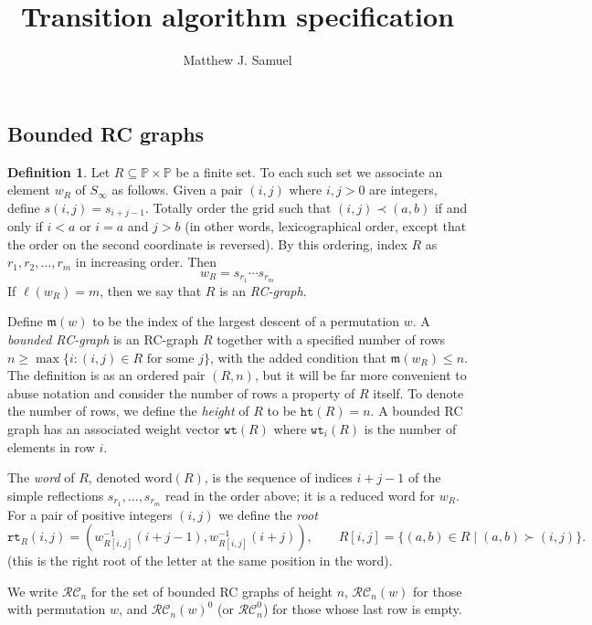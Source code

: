 \documentclass{amsart}
\title{Transition algorithm specification}
\author{Matthew J. Samuel}
\theoremstyle{definition}
\newtheorem{definition}[lemma]{Definition}
\theoremstyle{remark}
\numberwithin{equation}{subsection}
\newcommand{\wof}[1]{w_{#1}}
\newcommand{\wtt}{\mathtt{wt}}
\newcommand{\rtt}{\mathtt{rt}}
\newcommand{\hr}{\mathtt{ht}}
\newcommand{\RC}{\mathcal{RC}}
\newcommand{\maxd}{\mathfrak{m}}
\begin{document}
	\maketitle

\subsection{Bounded RC graphs}

\begin{definition}\label{definition:rcgraph}
	Let $R\subseteq \mathbb{P}\times \mathbb{P}$ be a finite set. To each such set we associate an element $\wof{R}$ of $S_\infty$ as follows. Given a pair $(i, j)$ where $i,j>0$ are integers, define $s(i,j) = s_{i+j - 1}$. Totally order the grid such that $(i, j) \prec (a, b)$ if and only if $i < a$ or $i = a$ and $j > b$ (in other words, lexicographical order, except that the order on the second coordinate is reversed). By this ordering, index $R$ as $r_1, r_2,\ldots, r_m$ in increasing order. Then
	$$\wof{R} = s_{r_1}\cdots s_{r_m}$$
	If $\ell(\wof{R}) = m$, then we say that $R$ is an \emph{RC-graph}.

	Define $\maxd(w)$ to be the index of the largest descent of a permutation $w$. A \emph{bounded RC-graph} is an RC-graph $R$ together with a specified number of rows $n\geq \max\{i: (i,j)\in R\text{ for some }j\}$, with the added condition that $\maxd(\wof{R})\leq n$. The definition is as an ordered pair $(R, n)$, but it will be far more convenient to abuse notation and consider the number of rows a property of $R$ itself. To denote the number of rows, we define the \emph{height} of $R$ to be $\hr(R)=n$. A bounded RC graph has an associated weight vector $\wtt(R)$ where $\wtt_i(R)$ is the number of elements in row $i$.

	The \emph{word} of $R$, denoted $\mathrm{word}(R)$, is the sequence of indices $i+j-1$ of the simple reflections $s_{r_1},\ldots,s_{r_m}$ read in the order above; it is a reduced word for $\wof{R}$. For a pair of positive integers $(i,j)$ we define the \emph{root}
	$$\rtt_R(i,j)=(\wof{R[i, j]}^{-1}(i + j - 1), \wof{R[i,j]}^{-1}(i+j)),\qquad R[i, j]=\{(a, b)\in R\mid (a, b) \succ (i, j)\}.$$
  (this is the right root of the letter at the same position in the word).

  We write $\RC_n$ for the set of bounded RC graphs of height $n$, $\RC_n(w)$ for those with permutation $w$, and $\RC_n(w)^0$ (or $\RC_n^0$) for those whose last row is empty.
\end{definition}
\end{document}
